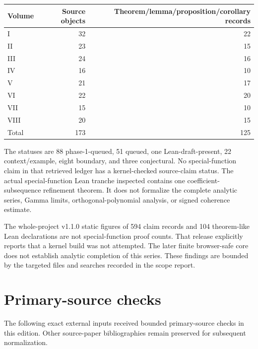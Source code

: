 \begin{center}
\begin{tabular}{lrr}
\toprule
Volume & Source objects & Theorem/lemma/proposition/corollary records\\
\midrule
I & 32 & 22\\
II & 23 & 15\\
III & 24 & 16\\
IV & 16 & 10\\
V & 21 & 17\\
VI & 22 & 20\\
VII & 15 & 10\\
VIII & 20 & 15\\
\midrule
Total & 173 & 125\\
\bottomrule
\end{tabular}
\end{center}

The statuses are 88 phase-1-queued, 51 queued, one Lean-draft-present, 22 context/example, eight boundary, and three conjectural. No special-function claim in that retrieved ledger has a kernel-checked source-claim status. The actual special-function Lean tranche inspected contains one coefficient-subsequence refinement theorem. It does not formalize the complete analytic series, Gamma limits, orthogonal-polynomial analysis, or signed coherence estimate.

The whole-project v1.1.0 static figures of 594 claim records and 104 theorem-like Lean declarations are not special-function proof counts. That release explicitly reports that a kernel build was not attempted. The later finite browser-safe core does not establish analytic completion of this series. These findings are bounded by the targeted files and searches recorded in the scope report.

\section{Primary-source checks}

The following exact external inputs received bounded primary-source checks in this edition. Other source-paper bibliographies remain preserved for subsequent normalization.

